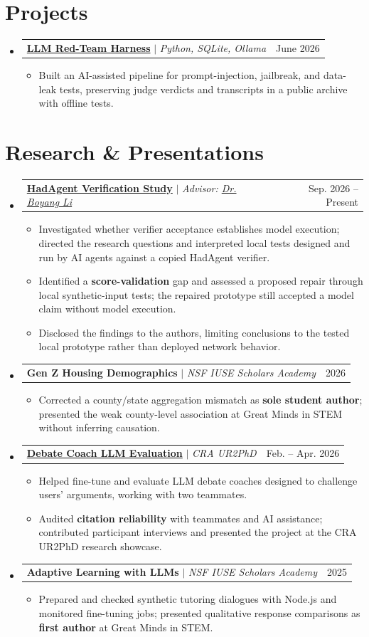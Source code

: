 \documentclass[letterpaper,11pt]{article}
\makeatletter
\newcommand{\resumeItem}[1]{
  \item\small{#1}
}
\newcommand{\resumeProjectHeading}[2]{
    \item
    \begin{tabular*}{0.97\textwidth}{l@{\extracolsep{\fill}}r}
      \small#1 & #2 \\
    \end{tabular*}\vspace{-7pt}
}
\newcommand{\resumeSubHeadingListStart}{\begin{itemize}[leftmargin=0.15in, label={}, topsep=0pt, partopsep=0pt, itemsep=0pt]\small}
\newcommand{\resumeSubHeadingListEnd}{\end{itemize}}
\newcommand{\resumeItemListStart}{\begin{itemize}[topsep=1pt, itemsep=-2pt, parsep=0pt]}
\newcommand{\resumeItemListEnd}{\end{itemize}\vspace{-6pt}}
\makeatother
\begin{document}
\section{Projects}
  \resumeSubHeadingListStart
    \resumeProjectHeading
      {\href{https://github.com/Vaunty/legacy-red-team-harness}{\textbf{LLM Red-Team Harness}} $|$ \emph{Python, SQLite, Ollama}}{June 2026}
      \resumeItemListStart
        \resumeItem{Built an AI-assisted pipeline for prompt-injection, jailbreak, and data-leak tests, preserving judge verdicts and transcripts in a public archive with offline tests.}
      \resumeItemListEnd
  \resumeSubHeadingListEnd

\section{Research \& Presentations}
  \resumeSubHeadingListStart
    \resumeProjectHeading
      {\href{https://github.com/Vaunty/hadagent-verification-study}{\textbf{HadAgent Verification Study}} $|$ \emph{Advisor: \href{https://www.liboyang.org/}{Dr. Boyang Li}}}{Sep. 2026 -- Present}
      \resumeItemListStart
        \resumeItem{Investigated whether verifier acceptance establishes model execution; directed the research questions and interpreted local tests designed and run by AI agents against a copied HadAgent verifier.}
        \resumeItem{Identified a \textbf{score-validation} gap and assessed a proposed repair through local synthetic-input tests; the repaired prototype still accepted a model claim without model execution.}
        \resumeItem{Disclosed the findings to the authors, limiting conclusions to the tested local prototype rather than deployed network behavior.}
      \resumeItemListEnd
    \resumeProjectHeading
      {\textbf{Gen Z Housing Demographics} $|$ \emph{NSF IUSE Scholars Academy}}{2026}
      \resumeItemListStart
        \resumeItem{Corrected a county/state aggregation mismatch as \textbf{sole student author}; presented the weak county-level association at Great Minds in STEM without inferring causation.}
      \resumeItemListEnd
    \resumeProjectHeading
      {\href{https://github.com/ponzek/DebateCoach}{\textbf{Debate Coach LLM Evaluation}} $|$ \emph{CRA UR2PhD}}{Feb. -- Apr. 2026}
      \resumeItemListStart
        \resumeItem{Helped fine-tune and evaluate LLM debate coaches designed to challenge users' arguments, working with two teammates.}
        \resumeItem{Audited \textbf{citation reliability} with teammates and AI assistance; contributed participant interviews and presented the project at the CRA UR2PhD research showcase.}
      \resumeItemListEnd
    \resumeProjectHeading
      {\textbf{Adaptive Learning with LLMs} $|$ \emph{NSF IUSE Scholars Academy}}{2025}
      \resumeItemListStart
        \resumeItem{Prepared and checked synthetic tutoring dialogues with Node.js and monitored fine-tuning jobs; presented qualitative response comparisons as \textbf{first author} at Great Minds in STEM.}
      \resumeItemListEnd
  \resumeSubHeadingListEnd
\end{document}
